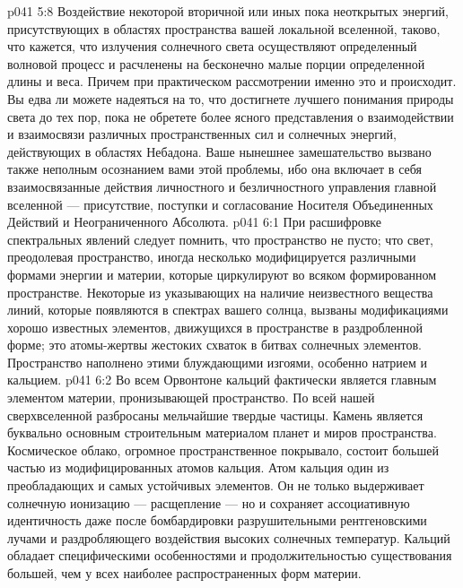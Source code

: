 \vs p041 5:8 Воздействие некоторой вторичной или иных пока неоткрытых энергий, присутствующих в областях пространства вашей локальной вселенной, таково, что кажется, что излучения солнечного света осуществляют определенный волновой процесс и расчленены на бесконечно малые порции определенной длины и веса. Причем при практическом рассмотрении именно это и происходит. Вы едва ли можете надеяться на то, что достигнете лучшего понимания природы света до тех пор, пока не обретете более ясного представления о взаимодействии и взаимосвязи различных пространственных сил и солнечных энергий, действующих в областях Небадона. Ваше нынешнее замешательство вызвано также неполным осознанием вами этой проблемы, ибо она включает в себя взаимосвязанные действия личностного и безличностного управления главной вселенной --- присутствие, поступки и согласование Носителя Объединенных Действий и Неограниченного Абсолюта.
\vs p041 6:1 При расшифровке спектральных явлений следует помнить, что пространство не пусто; что свет, преодолевая пространство, иногда несколько модифицируется различными формами энергии и материи, которые циркулируют во всяком формированном пространстве. Некоторые из указывающих на наличие неизвестного вещества линий, которые появляются в спектрах вашего солнца, вызваны модификациями хорошо известных элементов, движущихся в пространстве в раздробленной форме; это атомы\hyp{}жертвы жестоких схваток в битвах солнечных элементов. Пространство наполнено этими блуждающими изгоями, особенно натрием и кальцием.
\vs p041 6:2 Во всем Орвонтоне кальций фактически является главным элементом материи, пронизывающей пространство. По всей нашей сверхвселенной разбросаны мельчайшие твердые частицы. Камень является буквально основным строительным материалом планет и миров пространства. Космическое облако, огромное пространственное покрывало, состоит большей частью из модифицированных атомов кальция. Атом кальция один из преобладающих и самых устойчивых элементов. Он не только выдерживает солнечную ионизацию --- расщепление --- но и сохраняет ассоциативную идентичность даже после бомбардировки разрушительными рентгеновскими лучами и раздробляющего воздействия высоких солнечных температур. Кальций обладает специфическими особенностями и продолжительностью существования большей, чем у всех наиболее распространенных форм материи.
